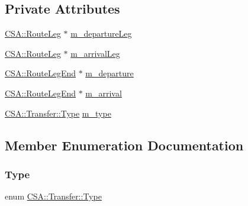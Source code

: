 \subsection*{Private Attributes}
\begin{DoxyCompactItemize}
\item 
\mbox{\hyperlink{classCSA_1_1RouteLeg}{C\+S\+A\+::\+Route\+Leg}} $\ast$ \mbox{\hyperlink{classCSA_1_1Transfer_afa7316db40bb5467407ea4cf564e2bc8}{m\+\_\+departure\+Leg}}
\item 
\mbox{\hyperlink{classCSA_1_1RouteLeg}{C\+S\+A\+::\+Route\+Leg}} $\ast$ \mbox{\hyperlink{classCSA_1_1Transfer_a744932ae13de04fdf196f3ab82195521}{m\+\_\+arrival\+Leg}}
\item 
\mbox{\hyperlink{classCSA_1_1RouteLegEnd}{C\+S\+A\+::\+Route\+Leg\+End}} $\ast$ \mbox{\hyperlink{classCSA_1_1Transfer_a5cbccf660e2eeb3235d43fae553b6143}{m\+\_\+departure}}
\item 
\mbox{\hyperlink{classCSA_1_1RouteLegEnd}{C\+S\+A\+::\+Route\+Leg\+End}} $\ast$ \mbox{\hyperlink{classCSA_1_1Transfer_af073c99651592dd83611889e1d1b7677}{m\+\_\+arrival}}
\item 
\mbox{\hyperlink{classCSA_1_1Transfer_a827daaa28edc2c4b10ddfa70762355ea}{C\+S\+A\+::\+Transfer\+::\+Type}} \mbox{\hyperlink{classCSA_1_1Transfer_a491227791f327d6a2a19ce6e91db37f6}{m\+\_\+type}}
\end{DoxyCompactItemize}


\subsection{Member Enumeration Documentation}
\mbox{\label{classCSA_1_1Transfer_a827daaa28edc2c4b10ddfa70762355ea}} 
\subsubsection{\texorpdfstring{Type}{Type}}
{\footnotesize\ttfamily enum \mbox{\hyperlink{classCSA_1_1Transfer_a827daaa28edc2c4b10ddfa70762355ea}{C\+S\+A\+::\+Transfer\+::\+Type}}\hspace{0.3cm}{\ttfamily [strong]}}

